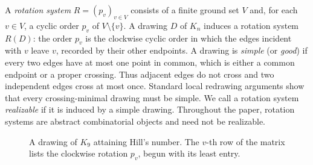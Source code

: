 \documentclass{article}
\theoremstyle{plain}
\theoremstyle{definition}
\theoremstyle{remark}
\begin{document}
A \emph{rotation system} \(R=(p_v)_{v\in V}\) consists of a finite
ground set \(V\) and, for each \(v\in V\), a cyclic order \(p_v\) of
\(V\setminus\{v\}\).  A drawing \(D\) of \(K_n\) induces a rotation
system \(R(D)\): the order \(p_v\) is the clockwise cyclic order in
which the edges incident with \(v\) leave \(v\), recorded by their
other endpoints. A drawing is \emph{simple} (or \emph{good}) if
every two edges have at most one point in common, which is either a
common endpoint or a proper crossing.  Thus adjacent edges do not cross and two independent
edges cross at most once.  Standard local redrawing arguments show that
every crossing-minimal drawing must be simple.  We call a rotation system \emph{realizable} if it is
induced by a simple drawing.  Throughout the paper, rotation systems
are abstract combinatorial objects and need not be realizable.

\begin{figure}
\centering
{}
\caption{A drawing of \(K_9\) attaining Hill's number. The \(v\)-th row of the matrix
lists the clockwise rotation \(p_v\), begun with its least entry.}
\label{fig:hill-k9}
\end{figure}
\end{document}
